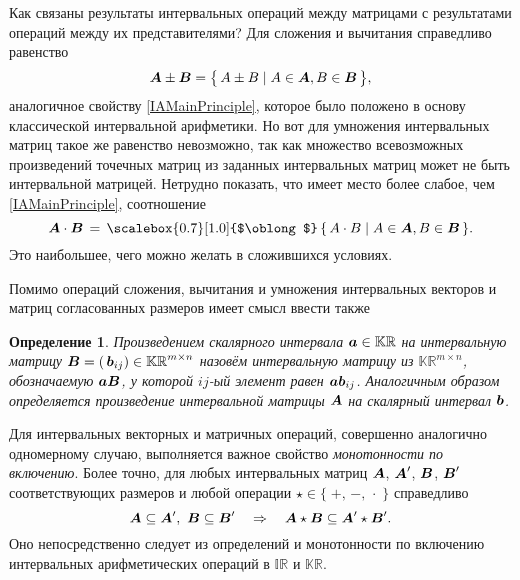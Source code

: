 \documentclass[a5paper,openany]{book}
\newcommand{\mbf}[1]{\protect\text{\boldmath$#1$}}
\newcommand{\mbb}{\mathbb}
\newcommand{\ih}{\scalebox{0.7}[1.0]{$\oblong$}}
\newtheorem{definition}{Определение}[section]
\begin{document}
Как связаны результаты интервальных операций между матрицами с результатами операций 
между их представителями? Для сложения и вычитания справедливо равенство 
\begin{equation*} 
\mbf{A}\pm\mbf{B} = \bigl\{\, A\pm B \mid A\in\mbf{A}, B\in\mbf{B}\,\bigr\}, 
\end{equation*} 
аналогичное свойству \eqref{IAMainPrinciple}, которое было положено в основу 
классической интервальной арифметики. Но вот для умножения интервальных матриц 
такое же равенство невозможно, так как множество всевозможных произведений 
точечных матриц из заданных интервальных матриц может не быть интервальной матрицей. 
Нетрудно показать, что имеет место более слабое, чем  \eqref{IAMainPrinciple}, 
соотношение 
\begin{equation*} 
\mbf{A}\cdot\mbf{B} \,  = \, 
   \ih\,\{\, A\cdot B \mid A\in\mbf{A}, B\in\mbf{B}\,\}. 
\end{equation*} 
Это наибольшее, чего можно желать в сложившихся условиях. 
  
Помимо операций сложения, вычитания и умножения интервальных векторов и матриц 
согласованных размеров имеет смысл ввести также 
  
\begin{definition}
Произведением скалярного интервала $\mbf{a}\in\mbb{KR}$ на интервальную матрицу 
$\mbf{B} = (\,\mbf{b}_{ij})\in\mbb{KR}^{m\times n}$ назовём интервальную матрицу 
из $\mbb{KR}^{m\times n}$, обозначаемую $\mbf{aB}$, у которой $ij$-ый элемент 
равен $\mbf{ab}_{ij}$. Аналогичным образом определяется произведение 
интервальной матрицы $\mbf{A}$ на скалярный интервал $\mbf{b}$. 
\end{definition}
  
Для интервальных векторных и матричных операций, совершенно аналогично одномерному 
случаю, выполняется важное свойство \emph{монотонности по включению}. Более точно, 
для любых интервальных матриц $\mbf{A}$, $\mbf{A}'$, $\mbf{B}$, $\mbf{B}'$ 
соответствующих размеров и любой операции $\star\in\{\;+,\,-,\,\cdot\;\}$ 
справедливо 
\begin{equation*} 
\mbf{A}\subseteq\mbf{A}',\ \mbf{B}\subseteq\mbf{B}'
\quad\Rightarrow\quad\mbf{A}\star\mbf{B}\subseteq\mbf{A}'\star\mbf{B}'. 
\index{монотонность по включению}
\end{equation*}
Оно непосредственно следует из определений и монотонности по включению
интервальных арифметических операций в $\mbb{IR}$ и $\mbb{KR}$.
    
  
  
\end{document}
